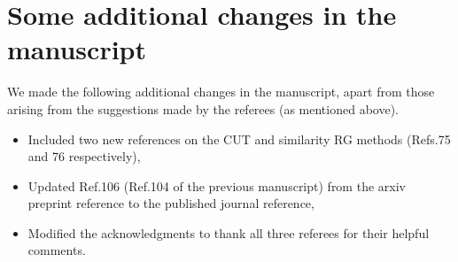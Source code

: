 \documentclass{article}
\begin{document}
\section{Some additional changes in the manuscript}
We made the following additional changes in the manuscript, apart from those arising from the suggestions made by the referees (as mentioned above).
\begin{itemize}
	\item Included two new references on the CUT and similarity RG methods (Refs.75 and 76 respectively),
	\item Updated Ref.106 (Ref.104 of the previous manuscript) from the arxiv preprint reference to the published journal reference,
	\item Modified the acknowledgments to thank all three referees for their helpful comments.
\end{itemize}



\end{document}
